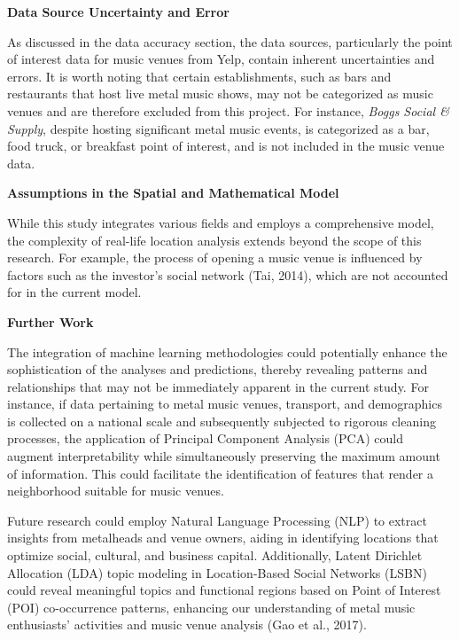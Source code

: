 \documentclass[11pt]{article}
\begin{document}
\textbf{Data Source Uncertainty and Error}

As discussed in the data accuracy section, the data sources, particularly the point of interest data for music venues from Yelp, contain inherent uncertainties and errors. It is worth noting that certain establishments, such as bars and restaurants that host live metal music shows, may not be categorized as music venues and are therefore excluded from this project. For instance, \textit{Boggs Social \& Supply}, despite hosting significant metal music events, is categorized as a bar, food truck, or breakfast point of interest, and is not included in the music venue data.

\textbf{Assumptions in the Spatial and Mathematical Model}

While this study integrates various fields and employs a comprehensive model, the complexity of real-life location analysis extends beyond the scope of this research. For example, the process of opening a music venue is influenced by factors such as the investor’s social network (Tai, 2014), which are not accounted for in the current model.


\textbf{Further Work}

The integration of machine learning methodologies could potentially enhance the sophistication of the analyses and predictions, thereby revealing patterns and relationships that may not be immediately apparent in the current study. For instance, if data pertaining to metal music venues, transport, and demographics is collected on a national scale and subsequently subjected to rigorous cleaning processes, the application of Principal Component Analysis (PCA) could augment interpretability while simultaneously preserving the maximum amount of information. This could facilitate the identification of features that render a neighborhood suitable for music venues.

Future research could employ Natural Language Processing (NLP) to extract insights from metalheads and venue owners, aiding in identifying locations that optimize social, cultural, and business capital. Additionally, Latent Dirichlet Allocation (LDA) topic modeling in Location-Based Social Networks (LSBN) could reveal meaningful topics and functional regions based on Point of Interest (POI) co-occurrence patterns, enhancing our understanding of metal music enthusiasts’ activities and music venue analysis (Gao et al., 2017).




\newpage
\end{document}
